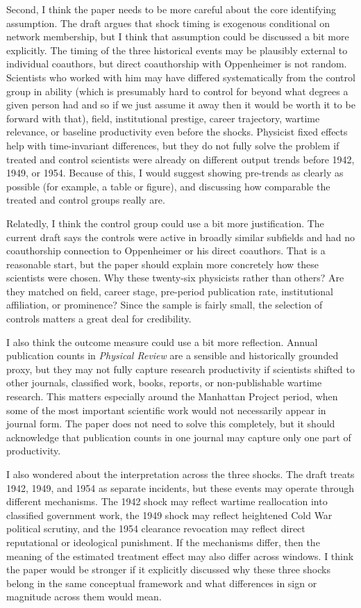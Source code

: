 \documentclass[12pt]{article}
\begin{document}
Second, I think the paper needs to be more careful about the core identifying assumption. The draft argues that shock timing is exogenous conditional on network membership, but I think that assumption could be discussed a bit more explicitly. The timing of the three historical events may be plausibly external to individual coauthors, but direct coauthorship with Oppenheimer is not random. Scientists who worked with him may have differed systematically from the control group in ability (which is presumably hard to control for beyond what degrees a given person had and so if we just assume it away then it would be worth it to be forward with that), field, institutional prestige, career trajectory, wartime relevance, or baseline productivity even before the shocks. Physicist fixed effects help with time-invariant differences, but they do not fully solve the problem if treated and control scientists were already on different output trends before 1942, 1949, or 1954. Because of this, I would suggest showing pre-trends as clearly as possible (for example, a table or figure), and discussing how comparable the treated and control groups really are.

Relatedly, I think the control group could use a bit more justification. The current draft says the controls were active in broadly similar subfields and had no coauthorship connection to Oppenheimer or his direct coauthors. That is a reasonable start, but the paper should explain more concretely how these scientists were chosen. Why these twenty-six physicists rather than others? Are they matched on field, career stage, pre-period publication rate, institutional affiliation, or prominence? Since the sample is fairly small, the selection of controls matters a great deal for credibility.

I also think the outcome measure could use a bit more reflection. Annual publication counts in \textit{Physical Review} are a sensible and historically grounded proxy, but they may not fully capture research productivity if scientists shifted to other journals, classified work, books, reports, or non-publishable wartime research. This matters especially around the Manhattan Project period, when some of the most important scientific work would not necessarily appear in journal form. The paper does not need to solve this completely, but it should acknowledge that publication counts in one journal may capture only one part of productivity.

I also wondered about the interpretation across the three shocks. The draft treats 1942, 1949, and 1954 as separate incidents, but these events may operate through different mechanisms. The 1942 shock may reflect wartime reallocation into classified government work, the 1949 shock may reflect heightened Cold War political scrutiny, and the 1954 clearance revocation may reflect direct reputational or ideological punishment. If the mechanisms differ, then the meaning of the estimated treatment effect may also differ across windows. I think the paper would be stronger if it explicitly discussed why these three shocks belong in the same conceptual framework and what differences in sign or magnitude across them would mean.
\end{document}
